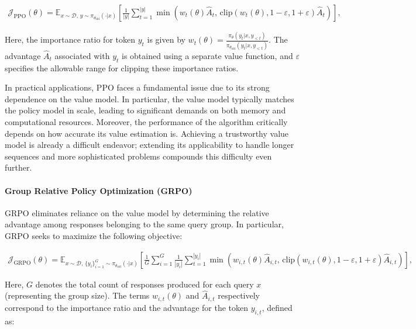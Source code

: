 \begin{align}
\mathcal{J}_\text{PPO}(\theta) = \mathbb{E}_{ x \sim \mathcal{D},\, y \sim \pi_{\theta_\text{old}}( \cdot | x) }
\left[ \frac{1}{|y|} \sum_{t=1}^{|y|} 
\min \left( w_{t}(\theta) \widehat{A}_{t},  \, \mathrm{clip} \left( w_{t}(\theta), 1 - {\varepsilon}, 1 + {\varepsilon}\right) \widehat{A}_{t} \right)
\right],
\end{align}

Here, the importance ratio for token $y_t$ is given by $
w_{t}(\theta) = \frac{ \pi_{\theta} (y_{t} | x, y_{<t}) }{ \pi_{\theta_\text{old}} (y_{t} | x,y_{<t})} $. The advantage $\widehat{A}_{t}$ associated with $y_t$ is obtained using a separate value function, and $\varepsilon$ specifies the allowable range for clipping these importance ratios.

In practical applications, PPO faces a fundamental issue due to its strong dependence on the value model. In particular, the value model typically matches the policy model in scale, leading to significant demands on both memory and computational resources. Moreover, the performance of the algorithm critically depends on how accurate its value estimation is. Achieving a trustworthy value model is already a difficult endeavor; extending its applicability to handle longer sequences and more sophisticated problems compounds this difficulty even further.

\paragraph{Group Relative Policy Optimization (GRPO)} GRPO \citep{grpo} eliminates reliance on the value model by determining the relative advantage among responses belonging to the same query group. In particular, GRPO seeks to maximize the following objective:

\begin{align}
\label{equ:grpo}
\mathcal{J}_\text{GRPO}(\theta) = \mathbb{E}_{ x \sim \mathcal{D},\, \{y_i\}_{i=1}^G \sim \pi_{\theta_\text{old}}( \cdot | x) }
\left[ \frac{1}{G} \sum_{i=1}^{G} \frac{1}{|y_i|} \sum_{t=1}^{|y_i|} 
\min \left( w_{i,t}(\theta) \widehat{A}_{i,t},  \, \mathrm{clip} \left( w_{i,t}(\theta), 1 - {\varepsilon}, 1 + {\varepsilon}\right) \widehat{A}_{i,t} \right)
\right],
\end{align}

Here, $G$ denotes the total count of responses produced for each query $x$ (representing the group size). The terms $w_{i,t}(\theta)$ and $\widehat{A}_{i,t}$ respectively correspond to the importance ratio and the advantage for the token $y_{i,t}$, defined as:

